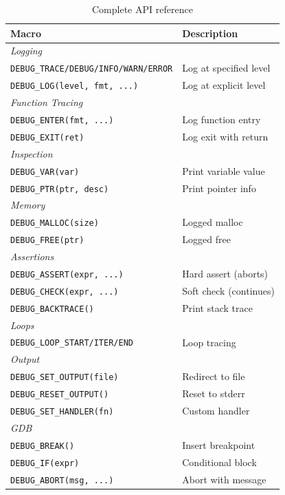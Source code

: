 \documentclass[11pt,a4paper]{article}
\begin{document}
\begin{table}[h]
\centering
\small
\begin{tabular}{@{}ll@{}}
\toprule
\textbf{Macro} & \textbf{Description} \\
\midrule
\multicolumn{2}{l}{\textit{Logging}} \\
\texttt{DEBUG\_TRACE/DEBUG/INFO/WARN/ERROR} & Log at specified level \\
\texttt{DEBUG\_LOG(level, fmt, ...)} & Log at explicit level \\
\midrule
\multicolumn{2}{l}{\textit{Function Tracing}} \\
\texttt{DEBUG\_ENTER(fmt, ...)} & Log function entry \\
\texttt{DEBUG\_EXIT(ret)} & Log exit with return \\
\midrule
\multicolumn{2}{l}{\textit{Inspection}} \\
\texttt{DEBUG\_VAR(var)} & Print variable value \\
\texttt{DEBUG\_PTR(ptr, desc)} & Print pointer info \\
\midrule
\multicolumn{2}{l}{\textit{Memory}} \\
\texttt{DEBUG\_MALLOC(size)} & Logged malloc \\
\texttt{DEBUG\_FREE(ptr)} & Logged free \\
\midrule
\multicolumn{2}{l}{\textit{Assertions}} \\
\texttt{DEBUG\_ASSERT(expr, ...)} & Hard assert (aborts) \\
\texttt{DEBUG\_CHECK(expr, ...)} & Soft check (continues) \\
\texttt{DEBUG\_BACKTRACE()} & Print stack trace \\
\midrule
\multicolumn{2}{l}{\textit{Loops}} \\
\texttt{DEBUG\_LOOP\_START/ITER/END} & Loop tracing \\
\midrule
\multicolumn{2}{l}{\textit{Output}} \\
\texttt{DEBUG\_SET\_OUTPUT(file)} & Redirect to file \\
\texttt{DEBUG\_RESET\_OUTPUT()} & Reset to stderr \\
\texttt{DEBUG\_SET\_HANDLER(fn)} & Custom handler \\
\midrule
\multicolumn{2}{l}{\textit{GDB}} \\
\texttt{DEBUG\_BREAK()} & Insert breakpoint \\
\texttt{DEBUG\_IF(expr)} & Conditional block \\
\texttt{DEBUG\_ABORT(msg, ...)} & Abort with message \\
\bottomrule
\end{tabular}
\caption{Complete API reference}
\end{table}
\end{document}
